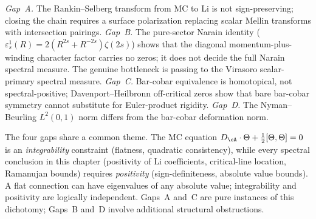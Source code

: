 \noindent
\emph{Gap~A.} The Rankin--Selberg transform from MC
to Li is not sign-preserving; closing the chain requires
a surface polarization replacing scalar Mellin transforms
with intersection pairings.
\emph{Gap~B.} The pure-sector Narain identity
($\varepsilon^1_s(R) = 2(R^{2s} + R^{-2s})\zeta(2s)$)
shows that the diagonal momentum-plus-winding character factor
carries no zeros; it does not decide the full Narain spectral
measure. The genuine bottleneck is passing to the Virasoro
scalar-primary spectral measure.
\emph{Gap~C.} Bar-cobar equivalence is homotopical, not
spectral-positive; Davenport--Heilbronn off-critical zeros
show that bare bar-cobar symmetry cannot substitute for
Euler-product rigidity.
\emph{Gap~D.} The Nyman--Beurling $L^2(0,1)$ norm differs
from the bar-cobar deformation norm.

\begin{remark}%
\label{rem:beilinson-four-gaps}%
%
The four gaps share a common theme. The MC equation
$D_\cA \cdot \Theta + \tfrac12[\Theta,\Theta] = 0$
is an \emph{integrability} constraint
(flatness, quadratic consistency), while every spectral
conclusion in this chapter (positivity of Li coefficients,
critical-line location, Ramanujan bounds) requires
\emph{positivity}
(sign-definiteness, absolute value bounds).
A flat connection can have eigenvalues of any absolute value;
integrability and positivity are logically independent.
Gaps~A and~C are pure instances of this dichotomy;
Gaps~B and~D involve additional structural obstructions.


\end{remark}

